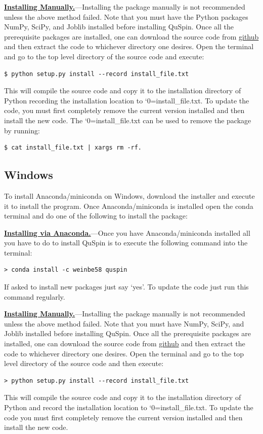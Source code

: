 \documentclass{SciPost}
\newcommand\0{\scalebox{-1}[1]{0}}
\let\svttfamily\ttfamily
\renewcommand\ttfamily{\svttfamily\catcode`0=\active }
\renewcommand\texttt{\bgroup\ttfamily\texttthelp}
\def\texttthelp#1{#1\egroup}
\begin{document}
\begin{appendix}
	\underline{\bf Installing Manually.}---Installing the package manually is not recommended unless the above method failed. Note that you must have the Python packages NumPy, SciPy, and Joblib installed before installing QuSpin. Once all the prerequisite packages are installed, one can download the source code from \href{https://github.com/weinbe58/qspin/tree/master}{github} and then extract the code to whichever directory one desires. Open the terminal and go to the top level directory of the source code and execute:
	\begin{lstlisting}[numbers=none,keywordstyle=\ttfamily]  
	$ python setup.py install --record install_file.txt
	\end{lstlisting}
	This will compile the source code and copy it to the installation directory of Python recording the installation location to \texttt{install\_file.txt}. To update the code, you must first completely remove the current version installed and then install the new code. The \texttt{install\_file.txt} can be used to remove the package by running:  
	\begin{lstlisting}[numbers=none,keywordstyle=\ttfamily]  
	$ cat install_file.txt | xargs rm -rf. 
	\end{lstlisting}
	
	\subsection{Windows}
	To install Anaconda/miniconda on Windows, download the installer and execute it to install the program. Once Anaconda/miniconda is installed open the conda terminal and do one of the following to install the package:
	
	\underline{\bf Installing via Anaconda.}---Once you have Anaconda/miniconda installed all you have to do to install QuSpin is to execute the following command into the terminal: 
	\begin{lstlisting}[numbers=none,keywordstyle=\ttfamily]
	> conda install -c weinbe58 quspin
	\end{lstlisting}
	If asked to install new packages just say `yes'. To update the code just run this command regularly. 
	
	\underline{\bf Installing Manually.}---Installing the package manually is not recommended unless the above method failed. Note that you must have NumPy, SciPy, and Joblib installed before installing QuSpin. Once all the prerequisite packages are installed, one can download the source code from \href{https://github.com/weinbe58/qspin/tree/master}{github} and then extract the code to whichever directory one desires. Open the terminal and go to the top level directory of the source code and then execute:  
	\begin{lstlisting}[numbers=none,keywordstyle=\ttfamily]
	> python setup.py install --record install_file.txt
	\end{lstlisting}
	This will compile the source code and copy it to the installation directory of Python and record the installation location to \texttt{install\_file.txt}. To update the code you must first completely remove the current version installed and then install the new code. 
	

\end{appendix}
\end{document}
